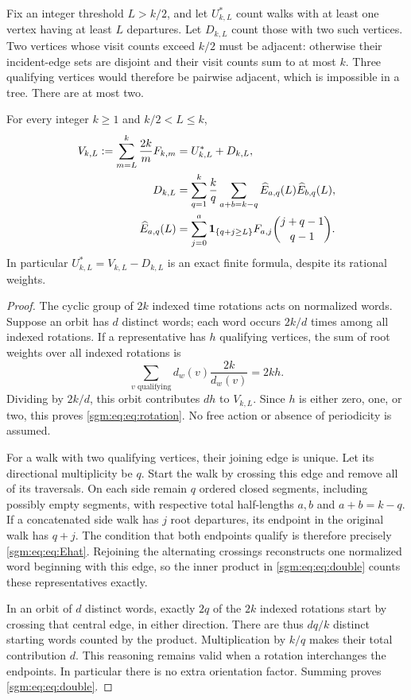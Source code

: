 \documentclass[11pt,letterpaper]{article}
\theoremstyle{remark}\newtheorem{remark}[theorem]{Remark}
\theoremstyle{definition}\newtheorem{definition}[theorem]{Definition}
\begin{document}
Fix an integer threshold $L>k/2$, and let $U_{k,L}^{*}$ count walks with at least one vertex having at least $L$ departures. Let $D_{k,L}$ count those with two such vertices. Two vertices whose visit counts exceed $k/2$ must be adjacent: otherwise their incident-edge sets are disjoint and their visit counts sum to at most $k$. Three qualifying vertices would therefore be pairwise adjacent, which is impossible in a tree. There are at most two.

\begin{proposition}\label{sgm:eq:prop:rotation}
For every integer $k\ge1$ and $k/2<L\le k$,
\begin{align}
 V_{k,L}:=\sum_{m=L}^k\frac{2k}{m}F_{k,m}
 &=U_{k,L}^{*}+D_{k,L},\label{sgm:eq:eq:rotation}\\
 D_{k,L}&=\sum_{q=1}^k\frac{k}{q}
              \sum_{a+b=k-q}\widehat E_{a,q}(L)\widehat E_{b,q}(L),\label{sgm:eq:eq:double}\\
 \widehat E_{a,q}(L)&=\sum_{j=0}^{a}\mathbf 1_{\{q+j\ge L\}}
                  F_{a,j}\binom{j+q-1}{q-1}.\label{sgm:eq:eq:Ehat}
\end{align}
In particular $U_{k,L}^{*}=V_{k,L}-D_{k,L}$ is an exact finite formula, despite its rational weights.
\end{proposition}
\begin{proof}
The cyclic group of $2k$ indexed time rotations acts on normalized words. Suppose an orbit has $d$ distinct words; each word occurs $2k/d$ times among all indexed rotations. If a representative has $h$ qualifying vertices, the sum of root weights over all indexed rotations is
\[
 \sum_{v\text{ qualifying}}d_w(v)\frac{2k}{d_w(v)}=2kh.
\]
Dividing by $2k/d$, this orbit contributes $dh$ to $V_{k,L}$. Since $h$ is either zero, one, or two, this proves \eqref{sgm:eq:eq:rotation}. No free action or absence of periodicity is assumed.

For a walk with two qualifying vertices, their joining edge is unique. Let its directional multiplicity be $q$. Start the walk by crossing this edge and remove all of its traversals. On each side remain $q$ ordered closed segments, including possibly empty segments, with respective total half-lengths $a,b$ and $a+b=k-q$. If a concatenated side walk has $j$ root departures, its endpoint in the original walk has $q+j$. The condition that both endpoints qualify is therefore precisely \eqref{sgm:eq:eq:Ehat}. Rejoining the alternating crossings reconstructs one normalized word beginning with this edge, so the inner product in \eqref{sgm:eq:eq:double} counts these representatives exactly.

In an orbit of $d$ distinct words, exactly $2q$ of the $2k$ indexed rotations start by crossing that central edge, in either direction. There are thus $dq/k$ distinct starting words counted by the product. Multiplication by $k/q$ makes their total contribution $d$. This reasoning remains valid when a rotation interchanges the endpoints. In particular there is no extra orientation factor. Summing proves \eqref{sgm:eq:eq:double}.
\end{proof}
\end{document}
